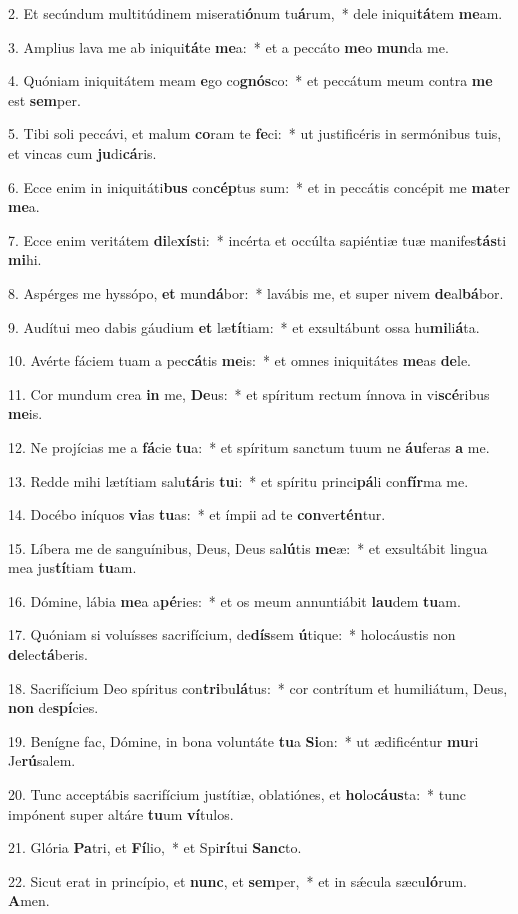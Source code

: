 2. Et secúndum multitúdinem miserati\textbf{ó}num tu\textbf{á}rum,~*  dele iniqui\textbf{tá}tem \textbf{me}am.\

3. Amplius lava me ab iniqui\textbf{tá}te \textbf{me}a:~*  et a peccáto \textbf{me}o \textbf{mun}da me.\

4. Quóniam iniquitátem meam \textbf{e}go co\textbf{gnós}co:~*  et peccátum meum contra \textbf{me} est \textbf{sem}per.\

5. Tibi soli peccávi, et malum \textbf{co}ram te \textbf{fe}ci:~*  ut justificéris in sermónibus tuis, et vincas cum \textbf{ju}di\textbf{cá}ris.\

6. Ecce enim in iniquitáti\textbf{bus} con\textbf{cép}tus sum:~*  et in peccátis concépit me \textbf{ma}ter \textbf{me}a.\

7. Ecce enim veritátem \textbf{di}le\textbf{xís}ti:~*  incérta et occúlta sapiéntiæ tuæ manifes\textbf{tás}ti \textbf{mi}hi.\

8. Aspérges me hyssópo, \textbf{et} mun\textbf{dá}bor:~*  lavábis me, et super nivem \textbf{de}al\textbf{bá}bor.\

9. Audítui meo dabis gáudium \textbf{et} læ\textbf{tí}tiam:~*  et exsultábunt ossa hu\textbf{mi}li\textbf{á}ta.\

10. Avérte fáciem tuam a pec\textbf{cá}tis \textbf{me}is:~*  et omnes iniquitátes \textbf{me}as \textbf{de}le.\

11. Cor mundum crea \textbf{in} me, \textbf{De}us:~*  et spíritum rectum ínnova in vi\textbf{scé}ribus \textbf{me}is.\

12. Ne projícias me a \textbf{fá}cie \textbf{tu}a:~*  et spíritum sanctum tuum ne \textbf{áu}feras \textbf{a} me.\

13. Redde mihi lætítiam salu\textbf{tá}ris \textbf{tu}i:~*  et spíritu princi\textbf{pá}li con\textbf{fír}ma me.\

14. Docébo iníquos \textbf{vi}as \textbf{tu}as:~*  et ímpii ad te \textbf{con}ver\textbf{tén}tur.\

15. Líbera me de sanguínibus, Deus, Deus sa\textbf{lú}tis \textbf{me}æ:~*  et exsultábit lingua mea jus\textbf{tí}tiam \textbf{tu}am.\

16. Dómine, lábia \textbf{me}a a\textbf{pé}ries:~*  et os meum annuntiábit \textbf{lau}dem \textbf{tu}am.\

17. Quóniam si voluísses sacrifícium, de\textbf{dís}sem \textbf{ú}tique:~*  holocáustis non \textbf{de}lec\textbf{tá}beris.\

18. Sacrifícium Deo spíritus con\textbf{tri}bu\textbf{lá}tus:~*  cor contrítum et humiliátum, Deus, \textbf{non} de\textbf{spí}cies.\

19. Benígne fac, Dómine, in bona voluntáte \textbf{tu}a \textbf{Si}on:~*  ut ædificéntur \textbf{mu}ri Je\textbf{rú}salem.\

20. Tunc acceptábis sacrifícium justítiæ, oblatiónes, et \textbf{ho}lo\textbf{cáus}ta:~*  tunc impónent super altáre \textbf{tu}um \textbf{ví}tulos.\

21. Glória \textbf{Pa}tri, et \textbf{Fí}lio,~*  et Spi\textbf{rí}tui \textbf{Sanc}to.\

22. Sicut erat in princípio, et \textbf{nunc}, et \textbf{sem}per,~*  et in sǽcula sæcu\textbf{ló}rum. \textbf{A}men.\

